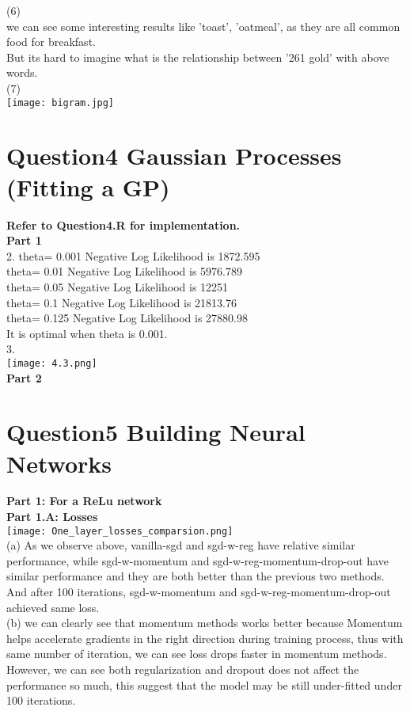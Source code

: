\documentclass{article}
\begin{document}
(6) \\
we can see some interesting results like 'toast', 'oatmeal', as they are all common food for breakfast. \\
But its hard to imagine what is the relationship between '261 gold' with above words. \\

(7) \\
\texttt{[image: bigram.jpg]}\\

\section{Question4 Gaussian Processes (Fitting a GP)} 
\textbf{Refer to Question4.R for implementation. } \\
\textbf{Part 1} \\
2. 
theta= 0.001 Negative Log Likelihood is 1872.595 \\
theta= 0.01 Negative Log Likelihood is 5976.789 \\
theta= 0.05 Negative Log Likelihood is 12251 \\
theta= 0.1 Negative Log Likelihood is 21813.76 \\
theta= 0.125 Negative Log Likelihood is 27880.98 \\
It is optimal when theta is 0.001. \\

3. \\
\texttt{[image: 4.3.png]}\\
\textbf{Part 2} \\

\section{Question5 Building Neural Networks} 
\textbf{Part 1: For a ReLu network} \\
\textbf{    Part 1.A: Losses} \\

\texttt{[image: One\_layer\_losses\_comparsion.png]}\\
(a) As we observe above, vanilla-sgd and sgd-w-reg have relative similar performance, while sgd-w-momentum and sgd-w-reg-momentum-drop-out have similar performance and they are both better than the previous two methods.  And after 100 iterations, sgd-w-momentum and sgd-w-reg-momentum-drop-out achieved same loss.\\
(b) we can clearly see that momentum methods works better because Momentum helps accelerate gradients in the right direction during training process, thus with same number of iteration, we can see loss drops faster in momentum methods. \\
However, we can see both regularization and dropout does not affect the performance so much, this suggest that the model may be still under-fitted under 100 iterations. \\
\end{document}
